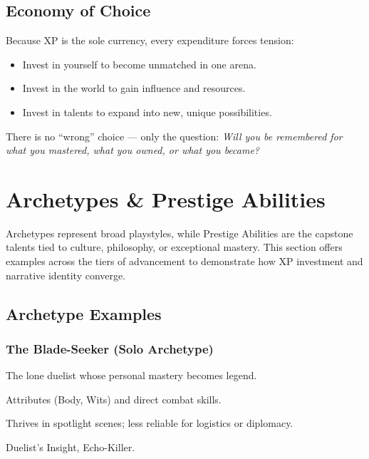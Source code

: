 \documentclass[12pt]{book}
\begin{document}
\section{Economy of Choice}
Because XP is the sole currency, every expenditure forces tension:  

\begin{itemize}
  \item Invest in yourself to become unmatched in one arena.  
  \item Invest in the world to gain influence and resources.  
  \item Invest in talents to expand into new, unique possibilities.  
\end{itemize}

There is no “wrong” choice — only the question: \emph{Will you be remembered for what you mastered, what you owned, or what you became?}

\chapter{Archetypes \& Prestige Abilities}

Archetypes represent broad playstyles, while Prestige Abilities are the capstone talents tied to culture, philosophy, or exceptional mastery.  
This section offers examples across the tiers of advancement to demonstrate how XP investment and narrative identity converge.

\section{Archetype Examples}

\subsection*{The Blade-Seeker (Solo Archetype)}
\begin{description}[leftmargin=2cm]
  \item[Theme:] The lone duelist whose personal mastery becomes legend.  
  \item[XP Focus:] Attributes (Body, Wits) and direct combat skills.  
  \item[Play Impact:] Thrives in spotlight scenes; less reliable for logistics or diplomacy.  
  \item[Prestige Gateways:] Duelist’s Insight, Echo-Killer.  
\end{description}
\end{document}
